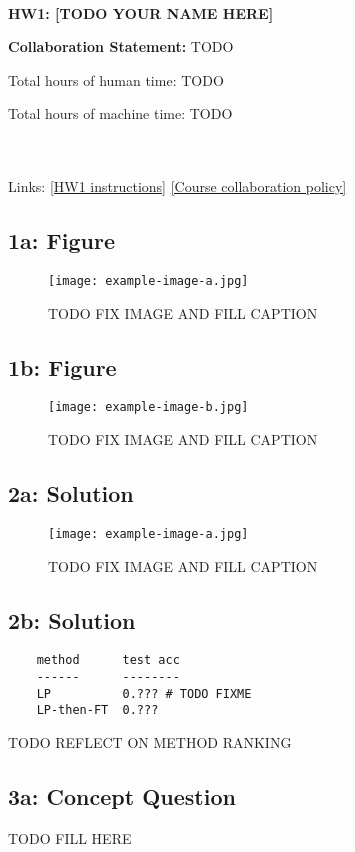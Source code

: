 \documentclass[10pt]{article}
\begin{document}
~~\\ %

{\Large{\bf HW1: [TODO YOUR NAME HERE] }}

\Large{\bf Collaboration Statement:} TODO

Total hours of human time: TODO

Total hours of machine time: TODO


~~\\
~~\\
Links: 
\href{https://www.cs.tufts.edu/cs/152L3D/2024f/hw1.html}{[HW1 instructions]} 
\href{https://www.cs.tufts.edu/cs/152L3D/2024f/index.html#collaboration}{[Course collaboration policy]} 

\setcounter{tocdepth}{2}
\tableofcontents

\newpage

\subsection{1a: Figure}
\renewcommand{\figurename}{Fig.}
\renewcommand{\thefigure}{1a}
 \begin{figure}[!h]
     \centering
     \texttt{[image: example-image-a.jpg]}
     \label{fig:1a}
\caption{
TODO FIX IMAGE AND FILL CAPTION
}%
 \end{figure}

\subsection{1b: Figure}
\renewcommand{\figurename}{Fig.}
\renewcommand{\thefigure}{1b}
 \begin{figure}[!h]
     \centering
     \texttt{[image: example-image-b.jpg]}
     \label{fig:1b}
\caption{
TODO FIX IMAGE AND FILL CAPTION
}%
 \end{figure}

\newpage 


\subsection{2a: Solution}
\renewcommand{\thefigure}{2a}
 \begin{figure}[!h]
     \centering
     \texttt{[image: example-image-a.jpg]}
     \label{fig:2a}
\caption{
TODO FIX IMAGE AND FILL CAPTION
}%
 \end{figure}

\subsection{2b: Solution}

\begin{verbatim}
    method      test acc
    ------      --------
    LP          0.??? # TODO FIXME
    LP-then-FT  0.???
\end{verbatim}

TODO REFLECT ON METHOD RANKING


\subsection{3a: Concept Question}

TODO FILL HERE
\end{document}
